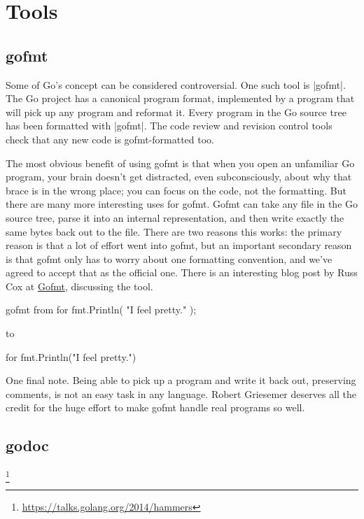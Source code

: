 \chapter{Tools}

\section{gofmt}

Some of Go's concept can be considered controversial. One such tool is |gofmt|. The Go project has 
a canonical program format, implemented by a program that will pick up any program and reformat it.
Every program in the Go source tree has been formatted with |gofmt|. The code review and revision control tools check that any new code is gofmt-formatted too.

The most obvious benefit of using gofmt is that when you open an unfamiliar Go program, your brain doesn't get distracted, even subconsciously, about why that brace is in the wrong place; you can focus on the code, not the formatting. But there are many more interesting uses for gofmt. Gofmt can take any file in the Go source tree, parse it into an internal representation, and then write exactly the same bytes back out to the file. There are two reasons this works: the primary reason is that a lot of effort went into gofmt, but an important secondary reason is that gofmt only has to worry about one formatting convention, and we've agreed to accept that as the official one.
There is an interesting blog post by Russ Cox at \href{http://research.swtch.com/gofmt}{Gofmt}, discussing the tool.

\begin{teX}
gofmt
from
for{
fmt.Println(      "I feel pretty." );
       }
\end{teX}
       
to

\begin{teX}
for {
    fmt.Println("I feel pretty.")
}
\end{teX}

One final note. Being able to pick up a program and write it back out, preserving comments, is not an easy task in any language. Robert Griesemer deserves all the credit for the huge effort to make gofmt handle real programs so well.

\section{godoc}


\footnote{\protect\url{https://talks.golang.org/2014/hammers}}

